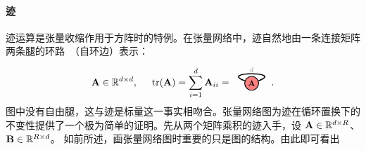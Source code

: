 \paragraph{迹} 迹运算是张量收缩作用于方阵时的特例。在张量网络中，迹自然地由一条连接矩阵两条腿的环路~（自环边）表示：
\begin{align*}
\Ab\in\RR^{d \times d},\hspace{0.5cm}
\tr(\Ab) = \sum_{i=1}^d\Ab_{ii} = \hspace*{-0.5cm}
\begin{tikzpicture}[baseline=\baseline]
   \tikzset{tensor/.style = {minimum size = 0.5cm,shape = circle,thick,draw=black,inner sep = 0pt}, edge/.style = {thick,line width=.4mm},every loop/.style={}}
    \def\y{0}
    \def\x{0}
    \node[tensor,fill=red!50!white] (A) at (\x,\y){\scalebox{0.85}{$\Ab$}};
    \draw[edge] (A) to [out=20,in=160, distance=1cm] (A);
    \node[draw=none] () at (\x,\y+0.5) {\scalebox{0.7}{\dimcolor{$d$}}};
    \end{tikzpicture}\hspace*{-0.5cm}.
\end{align*}
图中没有自由腿，这与迹是标量这一事实相吻合。张量网络图为迹在循环置换下的不变性提供了一个极为简单的证明。先从两个矩阵乘积的迹入手，设 $\mathbf{A} \in \mathbb{R}^{d\times R}$、$\mathbf{B} \in \mathbb{R}^{R\times d}$。  如前所述，画张量网络图时重要的只是图的结构。由此即可看出
